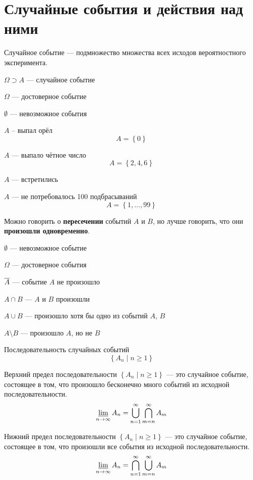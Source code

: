 \section{Случайные события и действия над ними}
\begin{definition}
Случайное событие --- подмножество множества всех исходов
вероятностного эксперимента.
\end{definition}
$\Omega \supset A$ --- случайное событие

$\Omega$ --- достоверное событие

$\emptyset$ --- невозможное события

\begin{example}
$A$ -- выпал орёл
$$A=\left\{0\right\}$$
\end{example}
\begin{example}
$A$ --- выпало чётное число
$$A = \left\{ 2,4,6 \right\}$$
\end{example}
\begin{example}
$A$ --- встретились
\end{example}
\begin{example}
$A$ --- не потребовалось 100 подбрасываний
$$A = \left\{ 1, \dots ,99 \right\}$$
\end{example}

Можно говорить о \textbf{пересечении} событий $A$ и $B$,
но лучше говорить, что они \textbf{произошли одновременно}.

$\emptyset$ --- невозможное событие

$\Omega$ --- достоверное события

$\overline{A}$ --- событие $A$ не произошло

$A\cap B$ --- $A$ и $B$ произошли

$A\cup B$ --- произошло хотя бы одно из событий $A$, $B$

$A\setminus B$ --- произошло $A$, но не $B$

\begin{definition}
Последовательность случайных событий
$$\left\{A_n\mid n\geq 1\right\}$$
\end{definition}
\begin{definition}
Верхний предел последовательности $\left\{A_n\mid n\geq 1\right\}$ --- это
случайное событие, состоящее в том, что произошло бесконечно много событий
из исходной последовательности.
$$\varliminf_{n \to \infty} A_n
= \bigcup_{n=1}^{\infty} \bigcap_{m=n}^{\infty} A_m $$
\end{definition}
\begin{definition}
Нижний предел последовательности $\left\{A_n\mid n\geq 1\right\}$ --- это
случайное событие, состоящее в том, что произошли все события
из исходной последовательности.
$$ \varliminf_{n \to \infty} A_n
= \bigcap_{n=1}^{\infty} \bigcup_{m=n}^{\infty} A_m $$
\end{definition}

